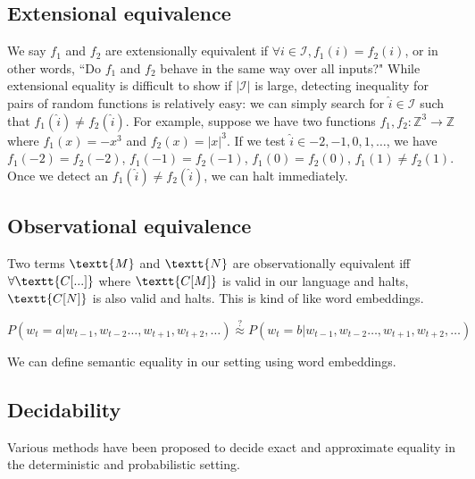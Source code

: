 \documentclass[11pt]{article}
\begin{document}
    \subsection{Extensional equivalence}\label{subsec:extensional-equivalence}

    We say $f_1$ and $f_2$ are extensionally equivalent if $\forall i \in \mathcal{I}, f_1(i)=f_2(i)$, or in other words, ``Do $f_1$ and $f_2$ behave in the same way over all inputs?" While extensional equality is difficult to show if $|\mathcal{I}|$ is large, detecting inequality for pairs of random functions is relatively easy: we can simply search for $\hat i \in \mathcal{I}$ such that $f_1(\hat i) \neq f_2(\hat i)$. For example, suppose we have two functions $f_1, f_2: \mathbb{Z}^3 \rightarrow \mathbb{Z}$ where $f_1(x)=-x^3$ and $f_2(x)=|x|^3$. If we test $\hat i \in {-2, -1, 0, 1, \ldots}$, we have $f_1(-2)=f_2(-2)$, $f_1(-1)=f_2(-1)$, $f_1(0)=f_2(0)$, $f_1(1) \neq f_2(1)$. Once we detect an $f_1(\hat i) \neq f_2(\hat i)$, we can halt immediately.

    \subsection{Observational equivalence}

    Two terms $\textt{M}$ and $\textt{N}$ are observationally equivalent iff $\forall \textt{C[...]}$ where $\textt{C[M]}$ is valid in our language and halts, $\textt{C[N]}$ is also valid and halts. This is kind of like word embeddings.

    $P(w_t = a | w_{t-1}, w_{t-2}\ldots, w_{t+1}, w_{t+2}, \ldots)\overset{?}{\approx} P(w_t = b | w_{t-1}, w_{t-2}\ldots, w_{t+1}, w_{t+2}, \ldots)$

    We can define semantic equality in our setting using word embeddings.

    \subsection{Decidability}\label{sec:algorithms}

    Various methods have been proposed to decide exact and approximate equality in the deterministic and probabilistic setting.
\end{document}
